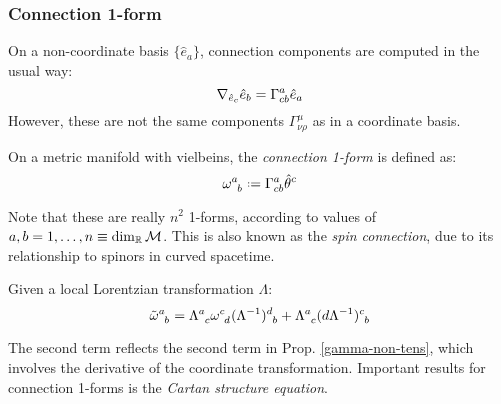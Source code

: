 \subsubsection{Connection 1-form}

On a non-coordinate basis $ \{\hat{e}_a\} $, connection components are computed in the usual way:
\begin{equation}
  \nabla_{\hat{e}_c} \hat{e}_b = \Gamma^a_{cb} \hat{e}_a
  \label{eq:3.76}
\end{equation}
However, these are not the same components $ \Gamma^\mu_{\nu \rho} $ as in a coordinate basis.

\begin{definition}
  On a metric manifold with vielbeins, the \textit{connection 1-form} is defined as:
  \begin{equation}
    \tensor{\omega}{^a_b} \defeq \Gamma^a_{cb} \hat{\theta}^c
    \label{eq:3.77}
  \end{equation}
\end{definition}

Note that these are really $ n^2 $ 1-forms, according to values of $ a,b = 1, \dots, n \equiv \dim_{\mathbb{R}} \mathcal{M} $. This is also known as the \textit{spin connection}, due to its relationship to spinors in curved spacetime.

\begin{proposition}
  Given a local Lorentzian transformation $ \Lambda $:
  \begin{equation}
    \tensor{\tilde{\omega}}{^a_b} = \tensor{\Lambda}{^a_c} \tensor{\omega}{^c_d} \tensor{(\Lambda^{-1})}{^d_b} + \tensor{\Lambda}{^a_c} \tensor{(d\Lambda^{-1})}{^c_b}
    \label{eq:3.78}
  \end{equation}
\end{proposition}

The second term reflects the second term in Prop. \ref{gamma-non-tens}, which involves the derivative of the coordinate transformation. Important results for connection 1-forms is the \textit{Cartan structure equation}.

